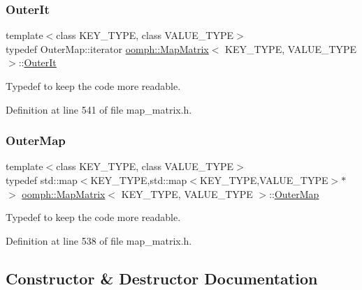 \mbox{\label{classoomph_1_1MapMatrix_a96c70b7ef6e89440c40648a6be9e4216}} 
\subsubsection{\texorpdfstring{Outer\+It}{OuterIt}}
{\footnotesize\ttfamily template$<$class K\+E\+Y\+\_\+\+T\+Y\+PE, class V\+A\+L\+U\+E\+\_\+\+T\+Y\+PE$>$ \\
typedef Outer\+Map\+::iterator \hyperlink{classoomph_1_1MapMatrix}{oomph\+::\+Map\+Matrix}$<$ K\+E\+Y\+\_\+\+T\+Y\+PE, V\+A\+L\+U\+E\+\_\+\+T\+Y\+PE $>$\+::\hyperlink{classoomph_1_1MapMatrix_a96c70b7ef6e89440c40648a6be9e4216}{Outer\+It}}



Typedef to keep the code more readable. 



Definition at line 541 of file map\+\_\+matrix.\+h.

\mbox{\label{classoomph_1_1MapMatrix_af73388510565fa9af6b2946d23bd7709}} 
\subsubsection{\texorpdfstring{Outer\+Map}{OuterMap}}
{\footnotesize\ttfamily template$<$class K\+E\+Y\+\_\+\+T\+Y\+PE, class V\+A\+L\+U\+E\+\_\+\+T\+Y\+PE$>$ \\
typedef std\+::map$<$K\+E\+Y\+\_\+\+T\+Y\+PE,std\+::map$<$K\+E\+Y\+\_\+\+T\+Y\+PE,V\+A\+L\+U\+E\+\_\+\+T\+Y\+PE$>$$\ast$$>$ \hyperlink{classoomph_1_1MapMatrix}{oomph\+::\+Map\+Matrix}$<$ K\+E\+Y\+\_\+\+T\+Y\+PE, V\+A\+L\+U\+E\+\_\+\+T\+Y\+PE $>$\+::\hyperlink{classoomph_1_1MapMatrix_af73388510565fa9af6b2946d23bd7709}{Outer\+Map}}



Typedef to keep the code more readable. 



Definition at line 538 of file map\+\_\+matrix.\+h.



\subsection{Constructor \& Destructor Documentation}
\mbox{\label{classoomph_1_1MapMatrix_a52ace9b2ef78f96cebbe3b6e2173a87c}} 
